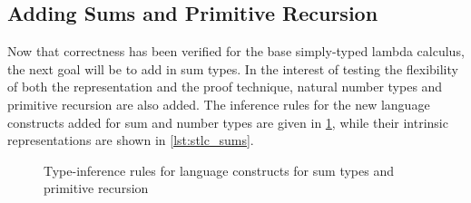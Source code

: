 \subsection{Adding Sums and Primitive Recursion}\label{sec:sum_prim}
  Now that correctness has been verified for the base simply-typed lambda calculus, the next goal will be to add in sum types.
  In the interest of testing the flexibility of both the representation and the proof technique, natural number types and primitive recursion are also added.
  The inference rules for the new language constructs added for sum and number types are given in \cref{fig:sum_prim_infer}, while their intrinsic representations are shown in \cref{lst:stlc_sums}.

  \begin{figure}
    \caption{Type-inference rules for language constructs for sum types and primitive recursion}
    \label{fig:sum_prim_infer}
  \end{figure}


